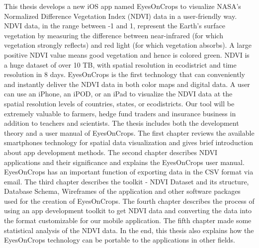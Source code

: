 
This thesis develops a new iOS app named EyesOnCrops to visualize NASA's Normalized Difference Vegetation Index (NDVI) data in a user-friendly way. NDVI data, in the range between -1 and 1, represent the Earth’s surface vegetation by measuring the difference between near-infrared (for which vegetation strongly reflects) and red light (for which vegetation absorbs). A large positive NDVI value means good vegetation and hence is colored green. NDVI is a huge dataset of over 10 TB, with spatial resolution in ecodistrict and time resolution in 8 days. EyesOnCrops is the first technology that can conveniently and instantly deliver the NDVI data in both color maps and digital data. A user can use an iPhone, an iPOD, or an iPad to visualize the NDVI data at the spatial resolution levels of countries, states, or ecodistricts. Our tool will be extremely valuable to farmers, hedge fund traders and insurance business in addition to teachers and scientists. The thesis includes both the development theory and a user manual of EyesOnCrops. The first chapter reviews the available smartphones technology for spatial data visualization and gives brief introduction about app development methods. The second chapter describes NDVI applications and their significance and explains the EyesOnCrops user manual. EyesOnCrops has an important function of exporting data in the CSV format via email. The third chapter describes the toolkit - NDVI Dataset and its structure, Database Schema, Wireframes of the application and other software packages used for the creation of EyesOnCrops. The fourth chapter describes the process of using an app development toolkit to get NDVI data and converting the data into the format customizable for our mobile application. The fifth chapter made some statistical analysis of the NDVI data. In the end, this thesis also explains how the EyesOnCrops technology can be portable to the applications in other fields.


